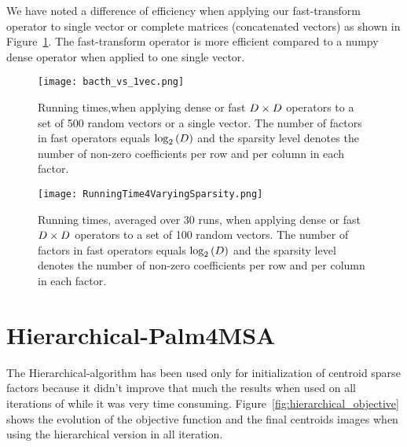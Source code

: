 We have noted a difference of efficiency when applying our fast-transform operator to single vector or complete matrices (concatenated vectors) as shown in Figure~\ref{fig:batch_vs_1vect}. The fast-transform operator is more efficient compared to a numpy dense operator when applied to one single vector.

\begin{figure}[tbh]
\centering
\texttt{[image: bacth\_vs\_1vec.png]}
\caption{Running times,when applying dense or fast $D \times D$ operators to a set of 500 random vectors or a single vector. The number of factors in fast operators equals $\log_2\left (D\right )$ and the sparsity level denotes the number of non-zero coefficients per row and per column in each factor.}
\label{fig:batch_vs_1vect}
\end{figure}

\begin{figure}[tbh]
\centering
\texttt{[image: RunningTime4VaryingSparsity.png]}
\caption{Running times, averaged over 30 runs, when applying dense or fast $D \times D$ operators to a set of 100 random vectors. The number of factors in fast operators equals $\log_2\left (D\right )$ and the sparsity level denotes the number of non-zero coefficients per row and per column in each factor.}
\label{fig:time_csr}
\end{figure}


\section{Hierarchical-Palm4MSA}
\label{supp:hierarchical}

The Hierarchical-\palm algorithm has been used only for initialization of centroid sparse factors because it didn't improve that much the results when used on all iterations of  \qkmeans while it was very time consuming. Figure~\ref{fig:hierarchical_objective} shows the evolution of the objective function and the final centroids images when using the hierarchical version in all iteration.


